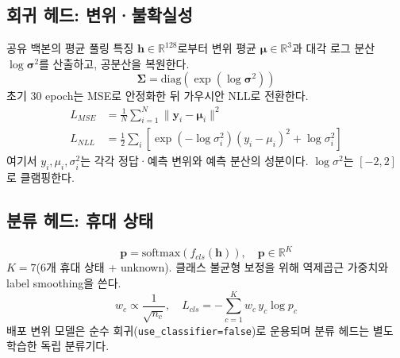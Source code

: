 \documentclass{kcc}
\begin{document}
\subsection{회귀 헤드: 변위·불확실성}
공유 백본의 평균 풀링 특징 $\mathbf{h}\in\mathbb{R}^{128}$로부터 변위 평균 $\bm{\mu}\in\mathbb{R}^3$과 대각 로그 분산 $\log\bm{\sigma}^2$를 산출하고, 공분산을 복원한다.
\begin{equation}
\bm{\Sigma}=\mathrm{diag}\!\left(\exp(\log\bm{\sigma}^2)\right)
\end{equation}
초기 30 epoch는 MSE로 안정화한 뒤 가우시안 NLL로 전환한다.
\begin{align}
L_{MSE}&=\frac{1}{N}\sum_{i=1}^{N}\lVert\mathbf{y}_i-\bm{\mu}_i\rVert^2\\
L_{NLL}&=\frac{1}{2}\sum_i\!\left[\exp(-\log\sigma_i^2)(y_i-\mu_i)^2+\log\sigma_i^2\right]
\end{align}
여기서 $y_i,\mu_i,\sigma_i^2$는 각각 정답·예측 변위와 예측 분산의 성분이다. $\log\sigma^2$는 $[-2,2]$로 클램핑한다.

\subsection{분류 헤드: 휴대 상태}
\begin{equation}
\mathbf{p}=\mathrm{softmax}(f_{cls}(\mathbf{h})),\quad \mathbf{p}\in\mathbb{R}^{K}
\end{equation}
$K=7$(6개 휴대 상태 + unknown). 클래스 불균형 보정을 위해 역제곱근 가중치와 label smoothing을 쓴다.
\begin{equation}
w_c\propto\frac{1}{\sqrt{n_c}},\quad L_{cls}=-\sum_{c=1}^{K}w_c\,y_c\log p_c
\end{equation}
배포 변위 모델은 순수 회귀(\texttt{use\_classifier=false})로 운용되며 분류 헤드는 별도 학습한 독립 분류기다.
\end{document}
